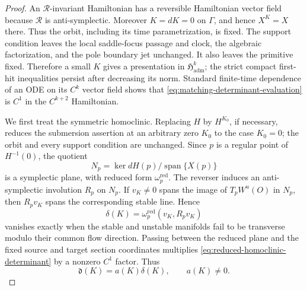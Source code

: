 \documentclass[11pt]{amsart}
\numberwithin{equation}{section}
\theoremstyle{definition}
\theoremstyle{remark}
\begin{document}
\begin{proof}
An $\mathcal R$-invariant Hamiltonian has a reversible Hamiltonian vector
field because $\mathcal R$ is anti-symplectic.  Moreover $K=dK=0$ on
$\Gamma$, and hence $X^K=X$ there.  Thus the orbit, including its time
parametrization, is fixed.  The support condition leaves the local
saddle-focus passage and clock, the algebraic factorization, and the pole
boundary jet unchanged.  It also leaves the primitive fixed.  Therefore a
small $K$ gives a presentation in $\mathfrak H_{\mathrm{adm}}^k$; the
strict compact first-hit inequalities persist after decreasing its norm.
Standard finite-time dependence of an ODE on its $C^k$ vector field shows
that \eqref{eq:matching-determinant-evaluation} is $C^1$ in the
$C^{k+2}$ Hamiltonian.

We first treat the symmetric homoclinic.  Replacing $H$ by $H^{K_0}$, if
necessary, reduces the submersion assertion at an arbitrary zero $K_0$ to
the case $K_0=0$; the orbit and every support condition are unchanged.
Since $p$ is a regular point of $H^{-1}(0)$, the quotient
\[
 N_p=\ker dH(p)/\operatorname{span}\{X(p)\}
\]
is a symplectic plane, with reduced form $\omega_p^{\mathrm{red}}$.
The reverser induces an anti-symplectic involution $R_p$ on $N_p$.  If
$v_K\ne0$ spans the image of $T_pW^u(O)$ in $N_p$, then $R_pv_K$ spans
the corresponding stable line.  Hence
\begin{equation}\label{eq:reduced-homoclinic-determinant}
 \delta(K)=\omega_p^{\mathrm{red}}(v_K,R_pv_K)
\end{equation}
vanishes exactly when the stable and unstable manifolds fail to be
transverse modulo their common flow direction.  Passing between the
reduced plane and the fixed source and target section coordinates
multiplies \eqref{eq:reduced-homoclinic-determinant} by a nonzero $C^1$
factor.  Thus
\begin{equation}\label{eq:matching-reduced-factor}
 \mathfrak d(K)=a(K)\delta(K),\qquad a(K)\ne0.
\end{equation}


\end{proof}
\end{document}
